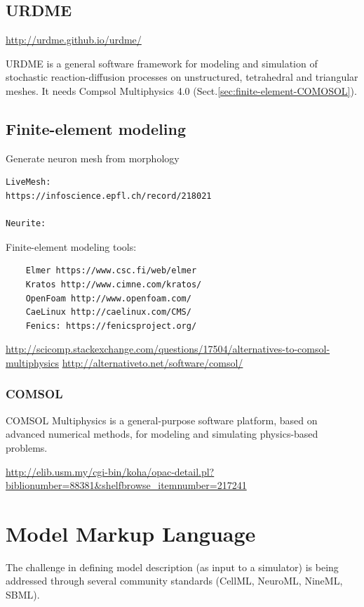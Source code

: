 \section{URDME}
\label{sec:URDME}

\url{http://urdme.github.io/urdme/}

URDME is a general software framework for modeling and simulation of stochastic
reaction-diffusion processes on unstructured, tetrahedral and triangular meshes.
It needs Compsol Multiphysics 4.0 (Sect.\ref{sec:finite-element-COMOSOL}).

\section{Finite-element modeling}
\label{sec:finite-element-modeling}


Generate neuron mesh from morphology
\begin{verbatim}
LiveMesh: 
https://infoscience.epfl.ch/record/218021

Neurite:  
\end{verbatim}

Finite-element modeling tools: 
\begin{verbatim}
    Elmer https://www.csc.fi/web/elmer
    Kratos http://www.cimne.com/kratos/
    OpenFoam http://www.openfoam.com/
    CaeLinux http://caelinux.com/CMS/
    Fenics: https://fenicsproject.org/
\end{verbatim}

\url{http://scicomp.stackexchange.com/questions/17504/alternatives-to-comsol-multiphysics}
\url{http://alternativeto.net/software/comsol/}


\subsection{COMSOL}
\label{sec:finite-element-COMSOL}

COMSOL Multiphysics is a general-purpose software platform, based on advanced
numerical methods, for modeling and simulating physics-based problems. 

\url{http://elib.usm.my/cgi-bin/koha/opac-detail.pl?biblionumber=88381&shelfbrowse_itemnumber=217241}

\chapter{Model Markup Language}


The challenge in defining model description (as input to a simulator) is being
addressed through several community standards (CellML, NeuroML, NineML, SBML).


